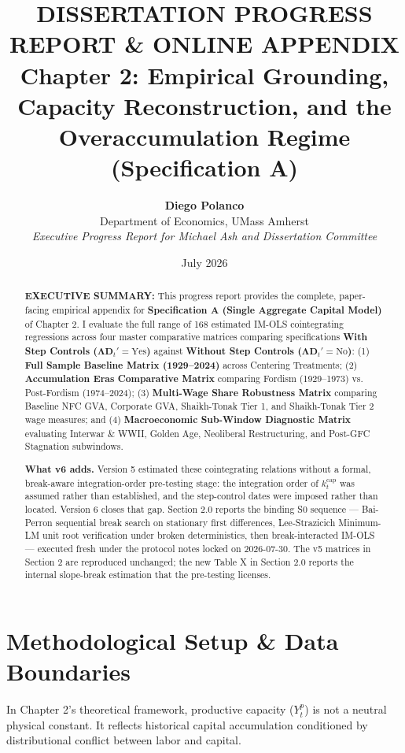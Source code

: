 \documentclass[11pt,a4paper]{article}
\title{\textbf{DISSERTATION PROGRESS REPORT \& ONLINE APPENDIX} \\[0.5em] \Large \textbf{Chapter 2: Empirical Grounding, Capacity Reconstruction, and the Overaccumulation Regime (Specification A)}}
\author{\textbf{Diego Polanco} \\ Department of Economics, UMass Amherst \\ \textit{Executive Progress Report for Michael Ash and Dissertation Committee}}
\date{July 2026}
\begin{document}
\maketitle

\begin{abstract}
\noindent \textbf{EXECUTIVE SUMMARY:} This progress report provides the complete, paper-facing empirical appendix for \textbf{Specification A (Single Aggregate Capital Model)} of Chapter 2. I evaluate the full range of 168 estimated IM-OLS cointegrating regressions across four master comparative matrices comparing specifications \textbf{With Step Controls ($\boldsymbol{\Lambda}\mathbf{D}_t' = \text{Yes}$)} against \textbf{Without Step Controls ($\boldsymbol{\Lambda}\mathbf{D}_t' = \text{No}$)}: (1) \textbf{Full Sample Baseline Matrix (1929--2024)} across Centering Treatments; (2) \textbf{Accumulation Eras Comparative Matrix} comparing Fordism (1929--1973) vs. Post-Fordism (1974--2024); (3) \textbf{Multi-Wage Share Robustness Matrix} comparing Baseline NFC GVA, Corporate GVA, Shaikh-Tonak Tier 1, and Shaikh-Tonak Tier 2 wage measures; and (4) \textbf{Macroeconomic Sub-Window Diagnostic Matrix} evaluating Interwar \& WWII, Golden Age, Neoliberal Restructuring, and Post-GFC Stagnation subwindows.

\noindent \textbf{What v6 adds.} Version 5 estimated these cointegrating relations without a formal, break-aware integration-order pre-testing stage: the integration order of $k_t^{\text{cap}}$ was assumed rather than established, and the step-control dates were imposed rather than located. Version 6 closes that gap. Section 2.0 reports the binding S0\* sequence --- Bai-Perron sequential break search on stationary first differences, Lee-Strazicich Minimum-LM unit root verification under broken deterministics, then break-interacted IM-OLS --- executed fresh under the protocol notes locked on 2026-07-30. The v5 matrices in Section 2 are reproduced unchanged; the new Table X in Section 2.0 reports the internal slope-break estimation that the pre-testing licenses.
\end{abstract}

\FloatBarrier
\section{Methodological Setup \& Data Boundaries}

In Chapter 2's theoretical framework, productive capacity ($Y^p_t$) is not a neutral physical constant. It reflects historical capital accumulation conditioned by distributional conflict between labor and capital.
\end{document}

